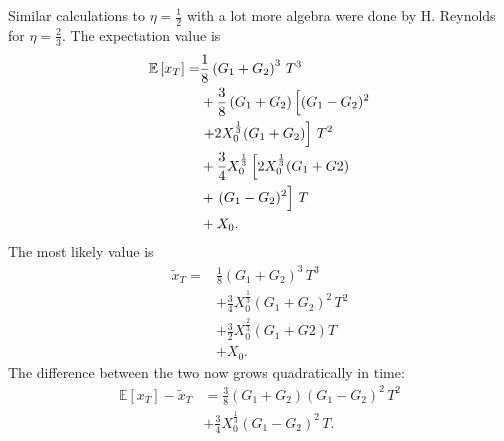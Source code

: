 \documentclass[11pt]{article}
\begin{document}
\begin{multicols}{2}
Similar calculations to $\eta=\frac{1}{2}$ with a lot more algebra were done by H. Reynolds for $\eta = \frac{2}{3}$. 
The expectation value is
\begin{align}
\label{eq:expectationExact2} \mathbb{E}\left[x_T\right] =& \frac{1}{8}\left( G_1+G_2\right)^3\,T^3 \\
\nonumber &+ \frac{3}{8} \left(G_1+G_2\right) \left[(G_1-G_2)^2 \vphantom{X_0^\frac{1}{3} }  \right.\\
\nonumber & \left.+ 2 X_0^\frac{1}{3} (G_1+G_2)\right]\,T^2\\
\nonumber & + \frac{3}{4} X_0^\frac{1}{3} \left[2 X_0^\frac{1}{3} (G_1+G2) \right.\\
\nonumber & + \left.(G_1-G_2)^2  \vphantom{X_0^\frac{1}{3} } \right]\,T\\
\nonumber &+ X_0.
\end{align}
The most likely value is
\begin{align}
\label{eq:mostLikely2} \widetilde{x}_T =& \frac{1}{8}\left( G_1+G_2\right)^3\,T^3 \\
\nonumber &+ \frac{3}{4} X_0^\frac{1}{3} (G_1+G_2)^2\,T^2\\
\nonumber & + \frac{3}{2} X_0^\frac{2}{3}  (G_1+G2) T\\
\nonumber &+ X_0.
\end{align}
The difference between the two now grows quadratically in time:
\begin{align}
\label{eq:difference2}\mathbb{E}\left[x_T \right] -  \widetilde{x}_T &= \frac{3}{8} (G_1+G_2)(G_1-G_2)^2\, T^2\\
\nonumber&+ \frac{3}{4} X_0^\frac{1}{3} (G_1-G_2)^2\,T.
\end{align}
\end{multicols}
\end{document}
